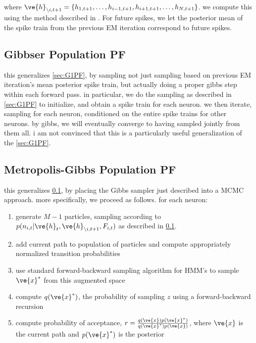 \documentclass[12pt]{article}
\newcommand{\x}{\ve{x}}
\newcommand{\h}{\ve{h}}
\begin{document}
\noindent where $\h_{\backslash i,t+1}=\{h_{1,t+1}, \ldots, h_{i-1,t+1}, h_{i+1,t+1}, \ldots, h_{N,t+1}\}$.  we compute this using the method described in \cite{PillowLatham07}.  For future spikes, we let the posterior mean of the spike train from the previous EM iteration correspond to future spikes.

\subsection{Gibbser Population PF} \label{sec:G2PF}

this generalizes \ref{sec:G1PF}, by sampling not just sampling based on previous EM iteration's mean posterior spike train, but actually doing a proper gibbs step within each forward pass. in particular, we do the sampling as described in \ref{sec:G1PF} to initialize, and obtain a spike train for each neuron.  we then iterate, sampling for each neuron, conditioned on the entire spike trains for other neurons.  by gibbs, we will eventually converge to having sampled jointly from them all. i am not convinced that this is a particularly useful generalization of the \ref{sec:G1PF}.


\subsection{Metropolis-Gibbs Population PF} \label{sec:G3PF}

this generalizes \ref{sec:G2PF}, by placing the Gibbs sampler just described into a MCMC approach.  more specifically, we proceed as follows. for each neuron:

\begin{enumerate}
\item generate $M-1$ particles, sampling according to $p( n_{i,t} | \h_t, \h_{\backslash i, t+1}, F_{i,t})$ as described in \ref{sec:G2PF}.  
\item add current path to population of particles and compute appropriately normalized transition probabilities
\item use standard forward-backward sampling algorithm for HMM's to sample $\x^{\ast}$ from this augmented space
\item compute $q(\x^{\ast})$, the probability of sampling $z$ using a forward-backward recursion
\item compute probability of acceptance, $r= \frac{q(\x) p(\x^{\ast})}{q(\x^{\ast})p(\x)}$, where $\x$ is the current path and $p(\x^{\ast})$ is the posterior
\end{enumerate}
\end{document}
